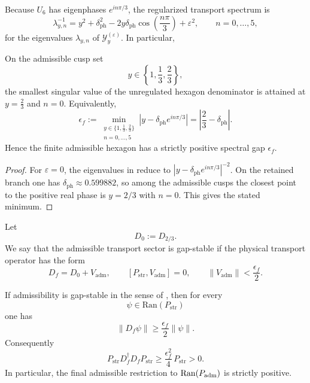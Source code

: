 Because $U_6$ has eigenphases $e^{in\pi/3}$, the regularized transport spectrum is
\begin{equation}
\label{eq:transport-spectrum}
\lambda_{y,n}^{-1}
=
y^2+\delta_{\mathrm{ph}}^2-2y\delta_{\mathrm{ph}}\cos\!\left(\frac{n\pi}{3}\right)+\varepsilon^2,
\qquad
n=0,\dots,5,
\end{equation}
for the eigenvalues $\lambda_{y,n}$ of $\mathcal Y_y^{(\varepsilon)}$. In particular,
\begin{lemma}
\label{lem:finite-admissible-hexagon-gap}
On the admissible cusp set
\[
y\in\left\{1,\frac13,\frac23\right\},
\]
the smallest singular value of the unregulated hexagon denominator is attained at $y=\frac23$ and $n=0$. Equivalently,
\[
\epsilon_f
:=
\min_{\substack{y\in\{1,\frac13,\frac23\}\\ n=0,\dots,5}}
\left|y-\delta_{\mathrm{ph}}e^{in\pi/3}\right|
=
\left|\frac23-\delta_{\mathrm{ph}}\right|.
\]
Hence the finite admissible hexagon has a strictly positive spectral gap $\epsilon_f$.
\end{lemma}

\begin{proof}
For $\varepsilon=0$, the eigenvalues in  reduce to $|y-\delta_{\mathrm{ph}}e^{in\pi/3}|^{-2}$. On the retained branch one has $\delta_{\mathrm{ph}}\approx \num{0.599882}$, so among the admissible cusps the closest point to the positive real phase is $y=2/3$ with $n=0$. This gives the stated minimum.
\end{proof}

\begin{definition}
\label{def:gap-stable-admissibility}
Let
\[
D_0:=D_{2/3}.
\]
We say that the admissible transport sector is gap-stable if the physical transport operator has the form
\[
D_f=D_0+V_{\mathrm{adm}},
\qquad
[P_{\mathrm{str}},V_{\mathrm{adm}}]=0,
\qquad
\|V_{\mathrm{adm}}\|<\frac{\epsilon_f}{2}.
\]
\end{definition}

\begin{proposition}
\label{prop:gap-lift-full-operator}
If admissibility is gap-stable in the sense of , then for every
\[
\psi\in\mathrm{Ran}(P_{\mathrm{str}})
\]
one has
\[
\|D_f\psi\|
\ge
\frac{\epsilon_f}{2}\|\psi\|.
\]
Consequently
\begin{equation}
\label{eq:gap-lift-full-operator}
P_{\mathrm{str}} D_f^\dagger D_f P_{\mathrm{str}}
\ge
\frac{\epsilon_f^2}{4}\,P_{\mathrm{str}}
>
0.
\end{equation}
In particular, the final admissible restriction to $\mathrm{Ran}(P_{\mathrm{adm}})$ is strictly positive.
\end{proposition}

